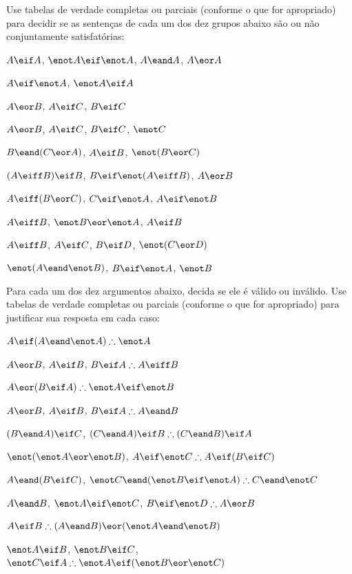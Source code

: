 \noindent\problempart
\label{pr.TT.satisfiable5}
Use tabelas de verdade completas ou parciais (conforme o que for apropriado) para decidir se as sentenças de cada um dos dez grupos abaixo são ou não conjuntamente satisfatórias:
\begin{earg}
\item $A\eif A$, $\enot A \eif \enot A$, $A\eand A$, $A\eor A$ %
\item $A \eif \enot A$, $\enot A \eif A$%
\item $A\eor B$, $A\eif C$, $B\eif C$ %
\item $A \eor B$, $A \eif C$, $B \eif C$, $\enot C$ %
\item $B\eand(C\eor A)$, $A\eif B$, $\enot(B\eor C)$  %
\item $(A \eiff B) \eif B$,  $B \eif \enot (A \eiff B)$, $A \eor B$  %
\item $A\eiff(B\eor C)$, $C\eif \enot A$, $A\eif \enot B$ %
\item  $A \eiff B$,  $\enot B \eor \enot A$,  $A \eif  B$ %
\item $A \eiff B$, $A \eif C$, $B \eif D$, $\enot(C \eor D)$ %
\item $\enot (A \eand \enot B)$,  $B \eif \enot A$, $\enot B$   %
\end{earg}

\noindent\problempart 
Para cada um dos dez argumentos abaixo, decida se ele é válido ou inválido.
Use tabelas de verdade completas ou parciais (conforme o que for apropriado) para justificar sua resposta em cada caso:
\label{pr.TT.valid5} 
\begin{earg}
\item $A\eif(A\eand\enot A)\therefore \enot A$%
\item $A \eor B$, $A \eif B$, $B \eif A \therefore  A \eiff B$  %
\item $A\eor(B\eif A)\therefore \enot A \eif \enot B$ %
\item $A \eor B$, $A \eif B$, $ B \eif A \therefore  A \eand B$ %
\item $(B\eand A)\eif C$, $(C\eand A)\eif B\therefore (C\eand B)\eif A$ %
\item $\enot (\enot A \eor \enot B)$, $A \eif \enot C \therefore  A \eif (B \eif C)$ %
\item $A \eand (B \eif C)$, $\enot C \eand (\enot B \eif \enot A)\therefore C \eand \enot C$ %
\item $A \eand B$, $\enot A \eif \enot C$, $B \eif \enot D \therefore  A \eor B$ %
\item $A \eif B\therefore (A \eand B) \eor (\enot A \eand \enot B)$ %
\item $\enot A \eif B$, $ \enot B \eif C $, $ \enot C \eif A \therefore  \enot A \eif (\enot B \eor \enot C) $%

\end{earg}

